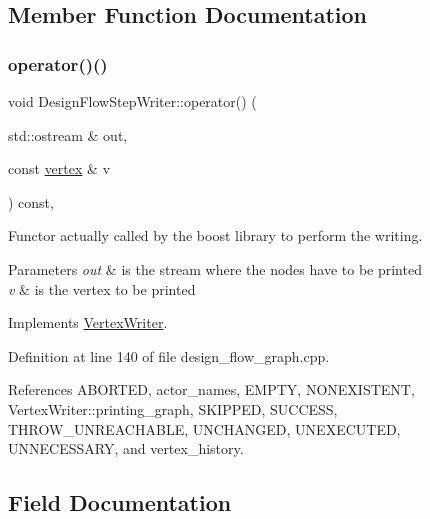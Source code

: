 \subsection{Member Function Documentation}
\mbox{\label{classDesignFlowStepWriter_a0d8ca8f65142a1331981d839462d8395}} 
\subsubsection{\texorpdfstring{operator()()}{operator()()}}
{\footnotesize\ttfamily void Design\+Flow\+Step\+Writer\+::operator() (\begin{DoxyParamCaption}\item[{std\+::ostream \&}]{out,  }\item[{const \hyperlink{graph_8hpp_abefdcf0544e601805af44eca032cca14}{vertex} \&}]{v }\end{DoxyParamCaption}) const\hspace{0.3cm}{\ttfamily [override]}, {\ttfamily [virtual]}}



Functor actually called by the boost library to perform the writing. 


\begin{DoxyParams}{Parameters}
{\em out} & is the stream where the nodes have to be printed \\
\hline
{\em v} & is the vertex to be printed \\
\hline
\end{DoxyParams}


Implements \hyperlink{classVertexWriter_a9df92a65d6e59d160be56eb8ec5cb84c}{Vertex\+Writer}.



Definition at line 140 of file design\+\_\+flow\+\_\+graph.\+cpp.



References A\+B\+O\+R\+T\+ED, actor\+\_\+names, E\+M\+P\+TY, N\+O\+N\+E\+X\+I\+S\+T\+E\+NT, Vertex\+Writer\+::printing\+\_\+graph, S\+K\+I\+P\+P\+ED, S\+U\+C\+C\+E\+SS, T\+H\+R\+O\+W\+\_\+\+U\+N\+R\+E\+A\+C\+H\+A\+B\+LE, U\+N\+C\+H\+A\+N\+G\+ED, U\+N\+E\+X\+E\+C\+U\+T\+ED, U\+N\+N\+E\+C\+E\+S\+S\+A\+RY, and vertex\+\_\+history.



\subsection{Field Documentation}
\mbox{\label{classDesignFlowStepWriter_a4e5109313c00181d72cb6a260340bfc9}} 
